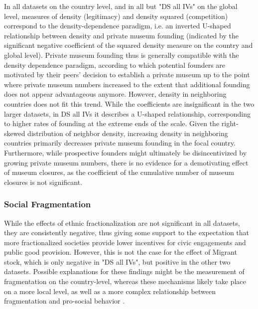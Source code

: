 \documentclass[11pt, authoryear]{elsarticle}
\begin{document}
In all datasets on the country level, and in all but "DS all IVs" on the global level, measures of density (legitimacy) and density squared (competition) correspond to the density-dependence paradigm, i.e. an inverted U-shaped relationship between density and private museum founding (indicated by the significant negative coefficient of the squared density measure on the country and global level). 
Private museum founding thus is generally compatible with the density dependence paradigm, according to which potential founders are motivated by their peers' decision to establish a private museum up to the point where private museum numbers increased to the extent that additional founding does not appear advantageous anymore.
However, density in neighboring countries does not fit this trend.
While the coefficients are insignificant in the two larger datasets, in DS all IVs it describes a U-shaped relationship, corresponding to higher rates of founding at the extreme ends of the scale.
Given the right-skewed distribution of neighbor density, increasing density in neighboring countries primarily decreases private museum founding in the focal country.
Furthermore, while prospective founders might ultimately be disincentivized by growing private museum numbers, there is no evidence for a demotivating effect of museum closures, as the coefficient of the cumulative number of museum closures is not significant.



\subsubsection{Social Fragmentation}

While the effects of ethnic fractionalization are not significant in all datasets, they are consistently negative, thus giving some support to the expectation that more fractionalized societies provide lower incentives for civic engagements and public good provision.
However, this is not the case for the effect of Migrant stock, which is only negative in "DS all IVs", but positive in the other two datasets.
Possible explanations for these findings might be the measurement of fragmentation on the country-level, whereas these mechanisms likely take place on a more local level, as well as a more complex relationship between fragmentation and pro-social behavior \citep{Baldassarri_Abascal_2020_diversity}.
\end{document}
